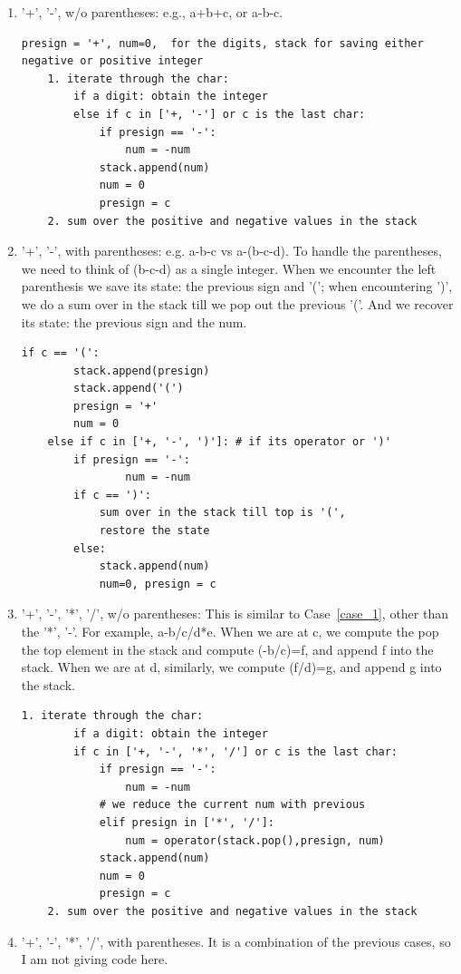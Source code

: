 \documentclass[../main.tex]{subfiles}
\begin{document}
\begin{enumerate}
    \item \label{case_1}'+', '-', w/o parentheses: e.g.,  a+b+c, or a-b-c.
    \begin{lstlisting}[numbers=none]
    presign = '+', num=0,  for the digits, stack for saving either negative or positive integer
    1. iterate through the char:
        if a digit: obtain the integer
        else if c in ['+, '-'] or c is the last char:
            if presign == '-': 
                num = -num
            stack.append(num)
            num = 0
            presign = c
    2. sum over the positive and negative values in the stack
    \end{lstlisting}
    \item '+', '-',  with parentheses: e.g. a-b-c vs a-(b-c-d). To handle the parentheses, we need to think of (b-c-d) as a single integer. When we encounter the left parenthesis we save its state: the previous sign and '('; when encountering ')', we do a sum over in the stack till we pop out the previous '('. And we recover its state: the previous sign and the num. 
    \begin{lstlisting}[numbers=none]
    if c == '(':
        stack.append(presign)
        stack.append('(') 
        presign = '+'
        num = 0
    else if c in ['+, '-', ')']: # if its operator or ')'
        if presign == '-': 
                num = -num
        if c == ')':
            sum over in the stack till top is '(',
            restore the state
        else:
            stack.append(num)
            num=0, presign = c
    \end{lstlisting}
    \item '+', '-', '*', '/', w/o parentheses: This is similar to Case~\ref{case_1}, other than the '*', '-'. For example, a-b/c/d*e. When we are at c, we compute the pop the top element in the stack and compute (-b/c)=f, and append f into the stack. When we are at d, similarly, we compute (f/d)=g, and append g into the stack. 
    \begin{lstlisting}[numbers=none]
    1. iterate through the char:
        if a digit: obtain the integer
        if c in ['+, '-', '*', '/'] or c is the last char:
            if presign == '-': 
                num = -num
            # we reduce the current num with previous
            elif presign in ['*', '/']:
                num = operator(stack.pop(),presign, num)
            stack.append(num)
            num = 0
            presign = c
    2. sum over the positive and negative values in the stack
    \end{lstlisting}
    \item '+', '-', '*', '/', with parentheses. It is a combination of the previous cases, so I am not giving code here. 
\end{enumerate}
\end{document}

